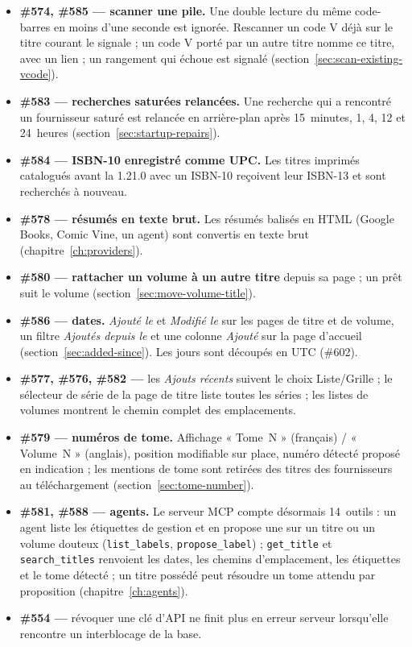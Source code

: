 \begin{itemize}
  \item \textbf{\#574, \#585 \string— scanner une pile.} Une double
        lecture du même code-barres en moins d'une seconde est ignorée.
        Rescanner un code V déjà sur le titre courant le signale ; un
        code V porté par un autre titre nomme ce titre, avec un lien ;
        un rangement qui échoue est signalé
        (section~\ref{sec:scan-existing-vcode}).
  \item \textbf{\#583 \string— recherches saturées relancées.} Une
        recherche qui a rencontré un fournisseur saturé est relancée en
        arrière-plan après 15~minutes, 1, 4, 12 et 24~heures
        (section~\ref{sec:startup-repairs}).
  \item \textbf{\#584 \string— ISBN-10 enregistré comme UPC.} Les
        titres imprimés catalogués avant la 1.21.0 avec un ISBN-10
        reçoivent leur ISBN-13 et sont recherchés à nouveau.
  \item \textbf{\#578 \string— résumés en texte brut.} Les résumés
        balisés en HTML (Google Books, Comic Vine, un agent) sont
        convertis en texte brut (chapitre~\ref{ch:providers}).
  \item \textbf{\#580 \string— rattacher un volume à un autre titre}
        depuis sa page ; un prêt suit le volume
        (section~\ref{sec:move-volume-title}).
  \item \textbf{\#586 \string— dates.} \emph{Ajouté le} et
        \emph{Modifié le} sur les pages de titre et de volume, un filtre
        \emph{Ajoutés depuis le} et une colonne \emph{Ajouté} sur la page
        d'accueil (section~\ref{sec:added-since}). Les jours sont
        découpés en UTC (\#602).
  \item \textbf{\#577, \#576, \#582 \string—} les \emph{Ajouts récents}
        suivent le choix Liste/Grille ; le sélecteur de série de la page
        de titre liste toutes les séries ; les listes de volumes
        montrent le chemin complet des emplacements.
  \item \textbf{\#579 \string— numéros de tome.} Affichage « Tome~N »
        (français) / « Volume~N » (anglais), position modifiable sur
        place, numéro détecté proposé en indication ; les mentions de
        tome sont retirées des titres des fournisseurs au téléchargement
        (section~\ref{sec:tome-number}).
  \item \textbf{\#581, \#588 \string— agents.} Le serveur MCP compte
        désormais 14~outils : un agent liste les étiquettes de gestion
        et en propose une sur un titre ou un volume douteux
        (\texttt{list\_labels}, \texttt{propose\_label}) ;
        \texttt{get\_title} et \texttt{search\_titles} renvoient les
        dates, les chemins d'emplacement, les étiquettes et le tome
        détecté ; un titre possédé peut résoudre un tome attendu par
        proposition (chapitre~\ref{ch:agents}).
  \item \textbf{\#554 \string—} révoquer une clé d'API ne finit plus en
        erreur serveur lorsqu'elle rencontre un interblocage de la base.
\end{itemize}

